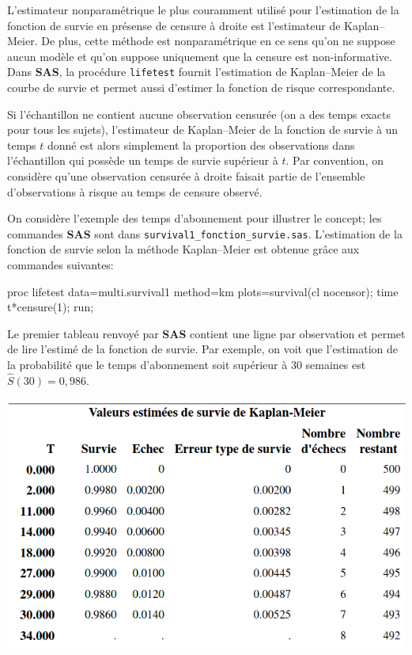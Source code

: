 \documentclass[
  11pt,
  letterpaper,
]{book}
\newenvironment{Shaded}{\begin{snugshade}}{\end{snugshade}}
\newcommand{\NormalTok}[1]{#1}
\theoremstyle{definition}
\theoremstyle{definition}
\theoremstyle{definition}
\theoremstyle{definition}
\theoremstyle{remark}
\begin{document}
L'estimateur nonparamétrique le plus couramment utilisé pour l'estimation de la fonction de survie en présense de censure à droite est l'estimateur de Kaplan--Meier. De plus, cette méthode est nonparamétrique en ce sens qu'on ne suppose aucun modèle et qu'on suppose uniquement que la censure est non-informative. Dans \textbf{SAS}, la procédure \texttt{lifetest} fournit l'estimation de Kaplan--Meier de la courbe de survie et permet aussi d'estimer la fonction de risque correspondante.

Si l'échantillon ne contient aucune observation censurée (on a des temps exacts pour tous les sujets), l'estimateur de Kaplan--Meier de la fonction de survie à un temps \(t\) donné est alors simplement la proportion des observations dans l'échantillon qui possède un temps de survie supérieur à \(t\). Par convention, on considère qu'une observation censurée à droite faisait partie de l'ensemble d'observations à risque au temps de censure observé.

On considère l'exemple des temps d'abonnement pour illustrer le concept; les commandes \textbf{SAS} sont dans \texttt{survival1\_fonction\_survie.sas}. L'estimation de la fonction de survie selon la méthode Kaplan--Meier est obtenue grâce aux commandes suivantes:

\begin{Shaded}
\begin{Highlighting}[]
\NormalTok{proc lifetest data=multi.survival1 method=km}
\NormalTok{       plots=survival(cl nocensor);}
\NormalTok{time t*censure(1);}
\NormalTok{run;}
\end{Highlighting}
\end{Shaded}

Le premier tableau renvoyé par \textbf{SAS} contient une ligne par observation et permet de lire l'estimé de la fonction de survie. Par exemple, on voit que l'estimation de la probabilité que le temps d'abonnement soit supérieur à 30 semaines est \(\widehat{S}(30)=0,986\).

\begin{center}\includegraphics[width=0.7\linewidth]{figures/05-survie-e1} \end{center}
\end{document}
